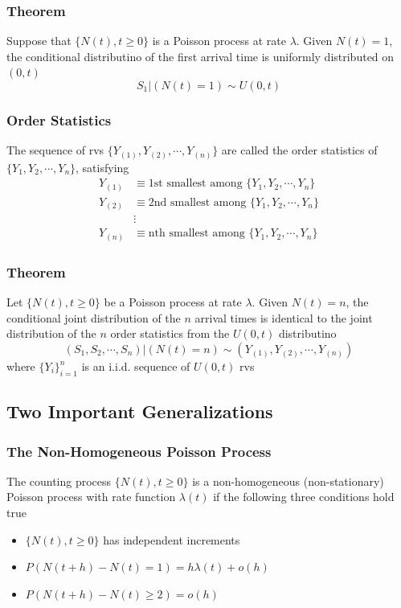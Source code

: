 \documentclass[11pt]{article}
\begin{document}
\subsubsection*{Theorem}
Suppose that $\{N(t),t\geq0\}$ is a Poisson process at rate $\lambda$. Given $N(t)=1$, the conditional 
distributino of the first arrival time is uniformly distributed on $(0,t)$ 
\[S_1|(N(t)=1)\sim U(0,t)\]
\subsubsection{Order Statistics}
The sequence of rvs $\{Y_{(1)},Y_{(2)},\cdots,Y_{(n)}\}$ are called the order statistics of $\{Y_1,Y_2,\cdots,Y_n\}$, satisfying 
\begin{align*}
    Y_{(1)} &\equiv \text{1st smallest among } \{Y_1,Y_2,\cdots,Y_n\} \\
    Y_{(2)} &\equiv \text{2nd smallest among } \{Y_1,Y_2,\cdots,Y_n\} \\
    &\vdots \\
    Y_{(n)} &\equiv \text{nth smallest among } \{Y_1,Y_2,\cdots,Y_n\}
\end{align*}
\subsubsection*{Theorem}
Let $\{N(t),t\geq0\}$ be a Poisson process at rate $\lambda$. Given $N(t)=n$, the conditional joint distribution 
of the $n$ arrival times is identical to the joint distribution of the $n$ order statistics from the $U(0,t)$ distributino 
\[(S_1,S_2,\cdots,S_n)|(N(t)=n)\sim (Y_{(1)},Y_{(2)},\cdots,Y_{(n)})\]
where $\{Y_i\}_{i=1}^{n}$ is an i.i.d. sequence of $U(0,t)$ rvs
\subsection{Two Important Generalizations}
\subsubsection{The Non-Homogeneous Poisson Process}
The counting process $\{N(t),t\geq0\}$ is a non-homogeneous (non-stationary) Poisson process with rate function $\lambda(t)$ if the 
following three conditions hold true 
\begin{itemize}
    \item $\{N(t),t\geq0\}$ has independent increments
    \item $P(N(t+h)-N(t)=1) = h\lambda(t) + o(h)$
    \item $P(N(t+h)-N(t)\geq 2)=o(h)$
\end{itemize}
\end{document}

